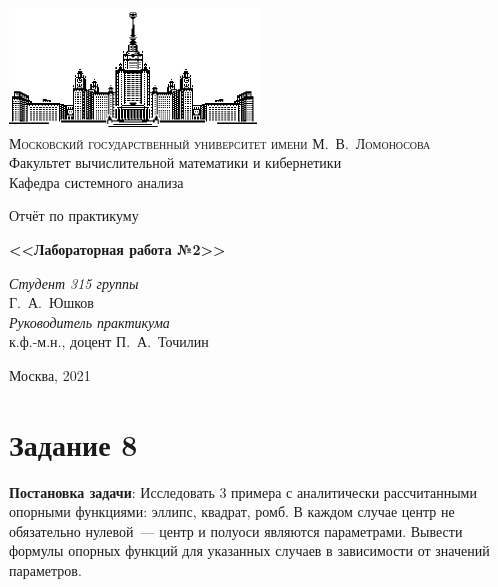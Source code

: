\documentclass[11pt]{article}
\theoremstyle{definition}
\begin{document}
\thispagestyle{empty}
\begin{center}
\vspace{-3cm}

\includegraphics[width=0.5\textwidth]{msu.eps}
\\

{\scshape Московский государственный университет имени М.~В.~Ломоносова}
\\
Факультет вычислительной математики и кибернетики
\\
Кафедра системного анализа

\vfill
{\LARGE Отчёт по практикуму}
\vspace{1cm}

{\Huge\bfseries <<Лабораторная работа №2>>}
\end{center}
\vspace{1cm}
\begin{flushright}
\large
\textit{Студент 315 группы}\\
Г.~А.~Юшков \\
\vspace{5mm}
\textit{Руководитель практикума}\\
к.ф.-м.н., доцент П.~А.~Точилин
\end{flushright}
\vfill
\begin{center}
Москва, 2021
\end{center}


\makeatother
\newpage

\newcommand{\scalar}[2]{\left<#1,#2\right>}
\newcommand{\sgn}[1]{\textrm{sgn}\left(#1\right)}
\newcommand{\conv }[0]{\textrm{conv}}
    
\tableofcontents
\newpage
    
    \section{Задание  8}
    {\bf Постановка задачи}:
    Исследовать 3 примера с аналитически рассчитанными опорными функциями: эллипс, квадрат, ромб. В каждом случае центр не обязательно нулевой~--- центр и полуоси являются параметрами. Вывести формулы опорных функций для указанных случаев в зависимости от значений параметров.
\end{document}
